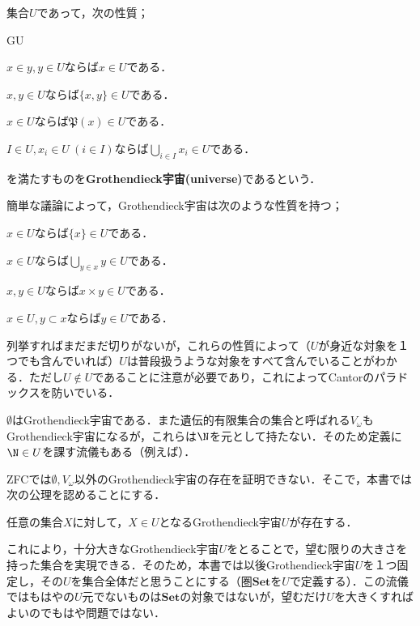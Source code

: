 \begin{tightcurve}
\begin{defi}[Grotendieck宇宙]
	集合$U$であって，次の性質；
	\begin{defiterm}{GU}
		\item $x\in y, y\in U$ならば$x\in U$である．
		\item $x, y\in U$ならば$\{x, y\}\in U$である．
		\item $x\in U$ならば$\mathfrak{P}(x)\in U$である．
		\item $I\in U, x_i\in U~(i\in I)$ならば$\bigcup_{i\in I}x_i\in U$である．
	\end{defiterm}
	を満たすものを\textbf{Grothendieck宇宙(universe)}であるという．
\end{defi}

簡単な議論によって，Grothendieck宇宙は次のような性質を持つ；
\begin{sakura}
	\item $x\in U$ならば$\{x\}\in U$である．
	\item $x\in U$ならば$\bigcup_{y\in x}y\in U$である．
	\item $x,y\in U$ならば$x\times y\in U$である．
	\item $x\in U,y\subset x$ならば$y\in U$である．
\end{sakura}

列挙すればまだまだ切りがないが，これらの性質によって（$U$が身近な対象を１つでも含んでいれば）$U$は普段扱うような対象をすべて含んでいることがわかる．ただし$U\not\in U$であることに注意が必要であり，これによってCantorのパラドックスを防いでいる．

$\emptyset$はGrothendieck宇宙である．また遺伝的有限集合の集合と呼ばれる$V_\omega$もGrothendieck宇宙になるが，これらは$\N$を元として持たない．そのため定義に$\N\in U$を課す流儀もある（例えば\cite{MacLane1998}）．

ZFCでは$\emptyset,V_\omega$以外のGrothendieck宇宙の存在を証明できない．そこで，本書では次の公理を認めることにする．

\begin{axi}[宇宙公理]
	任意の集合$X$に対して，$X\in U$となるGrothendieck宇宙$U$が存在する．
\end{axi}

これにより，十分大きなGrothendieck宇宙$U$をとることで，望む限りの大きさを持った集合を実現できる．そのため，本書では以後Grothendieck宇宙$U$を１つ固定し，その$U$を集合全体だと思うことにする（圏$\mathbf{Set}$を$U$で定義する）．この流儀ではもはやの$U$元でないものは$\mathbf{Set}$の対象ではないが，望むだけ$U$を大きくすればよいのでもはや問題ではない．


\end{tightcurve}
